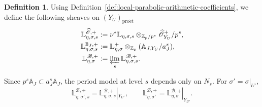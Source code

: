 \documentclass[11pt]{article}
\theoremstyle{definition}
\newtheorem{definition}[theorem]{Definition}
\newcommand{\Zp}{\mathbb Z_p}
\newcommand{\proet}{\mathrm{pro\acute et}}
\begin{document}
\begin{definition}
\label{def:local-parabolic-geometric-coefficients}
Using Definition~\ref{def:local-parabolic-arithmetic-coefficients},
we define the following sheaves on $(Y_U)_{\proet}$
\begin{align*}
 \mathbb L_{\eta,\sigma,s}^{\widehat{\mathscr O},+}
 &:=\nu^*\mathbb L_{\eta,\sigma,s}
       \otimes_{\Zp/p^s}\widehat{\mathscr O}_{Y_U}^+/p^s,\\
 \mathbb L_{\eta,\sigma,s}^{\mathbb B_J,+}
 &:=\mathbb L_{\eta,\sigma}^+
       \otimes_{\Zp}(\mathbb A_{J,Y_U}/a_J^s),\\
 \mathbb L_{\eta,\sigma}^{\mathscr B,+}
 &:=\varprojlim_s\mathbb L_{\eta,\sigma,s}^{\mathscr B,+}.
\end{align*}
\end{definition}
Since \(p^s\mathbb A_J\subset a_J^s\mathbb A_J\), the period
model at level \(s\) depends only on \(N_s\).
For \(\sigma'=\sigma|_{U'}\),
\begin{equation*}
 \mathbb L_{\eta,\sigma',s}^{\mathscr B,+}
 =\mathbb L_{\eta,\sigma,s}^{\mathscr B,+}|_{Y_{U'}},
 \qquad
 \mathbb L_{\eta,\sigma'}^{\mathscr B,+}
 =\mathbb L_{\eta,\sigma}^{\mathscr B,+}|_{Y_{U'}}.
\end{equation*}
\end{document}
